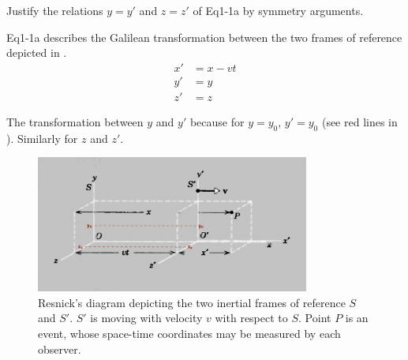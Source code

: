 
\begin{question}
  Justify the relations $y = y'$ and $z = z'$ of Eq1-1a by symmetry arguments.
\end{question}

\begin{solution}
  Eq1-1a describes the Galilean transformation between the two frames of reference depicted in .
  \begin{align*}
    x' &= x - vt \\
    y' &= y \\
    z' &= z
  \end{align*}

  The transformation between $y$ and $y'$ because for $y=y_0$, $y'=y_0$ (see red lines in ). Similarly for $z$ and $z'$.
\end{solution}

\begin{figure}[h] \centering
\includegraphics[width=9cm]{fig/1q1.png}
\caption{Resnick's diagram depicting the two inertial frames of reference $S$ and $S'$. $S'$ is moving with velocity $v$ with respect to $S$. Point $P$ is an event, whose space-time coordinates may be measured by each observer.}\label{fig:1q1}
\end{figure}


